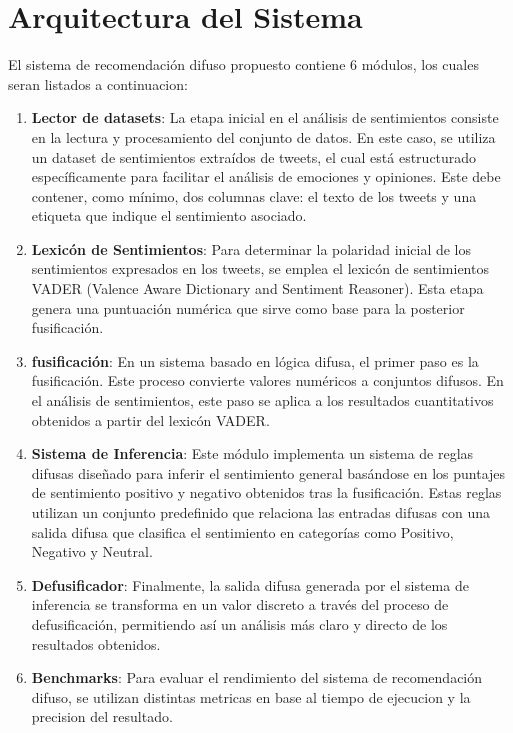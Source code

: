 \documentclass[sigconf, review=false, nonacm]{acmart}
\begin{document}
\section{Arquitectura del Sistema}

El sistema de recomendación difuso propuesto contiene 6 módulos, los cuales seran listados a continuacion:
\begin{enumerate}
	\item \textbf{Lector de datasets}: La etapa inicial en el análisis de sentimientos consiste en la lectura
	      y procesamiento del conjunto de datos. En este caso, se utiliza un dataset de sentimientos extraídos
	      de tweets, el cual está estructurado específicamente para facilitar el análisis de emociones y
	      opiniones. Este debe contener, como mínimo, dos columnas clave: el texto de los tweets y una etiqueta
	      que indique el sentimiento asociado.

	\item \textbf{Lexicón de Sentimientos}: Para determinar la polaridad inicial de los sentimientos
	      expresados en los tweets, se emplea el lexicón de sentimientos VADER (Valence Aware Dictionary and
	      Sentiment Reasoner). Esta etapa genera una puntuación numérica que sirve como base para la posterior
	      fusificación.

	\item \textbf{fusificación}: En un sistema basado en lógica difusa, el primer paso es la fusificación.
	      Este proceso convierte valores numéricos a conjuntos difusos. En el análisis de sentimientos, este
	      paso se aplica a los resultados cuantitativos obtenidos a partir del lexicón VADER.

	\item \textbf{Sistema de Inferencia}: Este módulo implementa un sistema de reglas difusas diseñado
	      para inferir el sentimiento general basándose en los puntajes de sentimiento positivo y negativo
	      obtenidos tras la fusificación. Estas reglas utilizan un conjunto predefinido que relaciona las
	      entradas difusas con una salida difusa que clasifica el sentimiento en categorías como Positivo,
	      Negativo y Neutral.

	\item \textbf{Defusificador}: Finalmente, la salida difusa generada por el sistema de inferencia se
	      transforma en un valor discreto a través del proceso de defusificación, permitiendo así un análisis
	      más claro y directo de los resultados obtenidos.

	\item \textbf{Benchmarks}: Para evaluar el rendimiento del sistema de recomendación difuso, se utilizan
	      distintas metricas en base al tiempo de ejecucion y la precision del resultado.
\end{enumerate}
\end{document}
